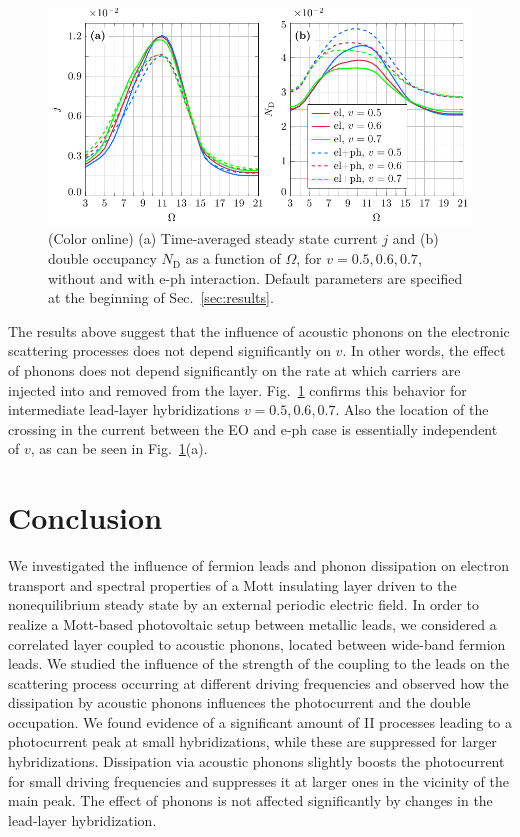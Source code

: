 \documentclass[aps,prb,groupedaddress,showpacs,twocolumn,superscriptaddress,10pt]{revtex4-2}
\begin{document}
\begin{figure}[b] 
\includegraphics[width=\linewidth]{Fig8.pdf}
\caption{(Color online) (a) Time-averaged steady state current $j$ and (b) double occupancy $N_{\text{D}}$ as a function of $\Omega$, for $v=0.5,0.6,0.7$, without and with e-ph interaction. Default parameters are specified at the beginning of Sec.~\ref{sec:results}.} 
\label{fig:j_vs_omega_mu1_sweep_v_E0_2_eph}
\end{figure} 
     
The results above suggest that the influence of acoustic phonons on the electronic scattering processes does not depend significantly on $v$. In other words, the effect of phonons does not depend significantly on the rate at which carriers are injected into and removed from the layer. Fig.~\ref{fig:j_vs_omega_mu1_sweep_v_E0_2_eph} confirms this behavior for intermediate lead-layer hybridizations $v=0.5,0.6,0.7$. Also the location of the crossing in the current  between the EO and e-ph case is essentially independent of $v$, as can be seen in Fig.~\ref{fig:j_vs_omega_mu1_sweep_v_E0_2_eph}(a).

\section{Conclusion}   
\label{sec:conclusions} 
 
We investigated the influence of fermion leads and phonon dissipation on electron transport and spectral properties of a Mott insulating layer driven to the nonequilibrium steady state by an external periodic electric field. In order to realize a Mott-based photovoltaic setup between metallic leads, we considered a correlated layer coupled to acoustic phonons, located between wide-band fermion leads. We studied the influence of the strength of the coupling to the leads on the scattering process occurring at different driving frequencies and observed how the dissipation by acoustic phonons influences the photocurrent and the double occupation. We found evidence of a significant amount of II processes leading to a photocurrent peak at small hybridizations, while these are suppressed  for larger hybridizations. Dissipation via acoustic phonons slightly boosts the photocurrent for small driving frequencies and suppresses it at larger ones in the vicinity of the main peak. The effect of phonons is not affected significantly by changes in the lead-layer hybridization.
   
\end{document}
